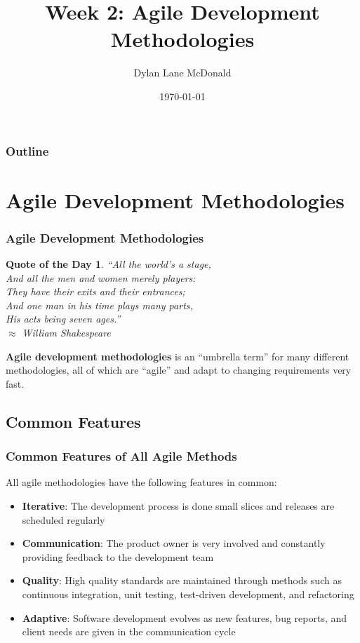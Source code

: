 \documentclass[aspectratio=169]{beamer}
\title{Week 2: Agile Development Methodologies}
\author{Dylan Lane McDonald}
\institute{CNM STEMulus Center\\Web Development with PHP}
\date{\today}
\newtheorem{qotd}{Quote of the Day}
\begin{document}
\lstset{language=Java}
\begin{frame}
\titlepage
\end{frame}

\begin{frame}
\frametitle{Outline}
\tableofcontents
\end{frame}

\section{Agile Development Methodologies}
\begin{frame}
\frametitle{Agile Development Methodologies}
\begin{qotd}
``All the world's a stage,\\
And all the men and women merely players:\\
They have their exits and their entrances;\\
And one man in his time plays many parts,\\
His acts being seven ages.''\\
$\approx$ William Shakespeare
\end{qotd}
\pause
\textbf{Agile development methodologies} is an ``umbrella term'' for many different methodologies, all of which are ``agile'' and adapt to changing requirements very fast.
\end{frame}


\subsection{Common Features}
\begin{frame}
\frametitle{Common Features of All Agile Methods}
All agile methodologies have  the following features in common:
\begin{itemize}
	\item \textbf{Iterative}: The development process is done small slices and releases are scheduled regularly
	\item \textbf{Communication}: The product owner is very involved and constantly providing feedback to the development team
	\item \textbf{Quality}: High quality standards are maintained through methods such as continuous integration, unit testing, test-driven development, and refactoring
	\item \textbf{Adaptive}: Software development evolves as new features, bug reports, and client needs are given in the communication cycle  
\end{itemize}
\end{frame}
\end{document}
